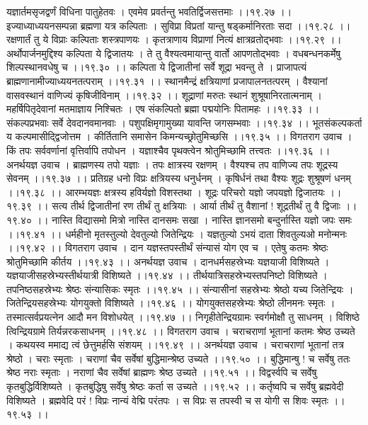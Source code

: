 \documentclass[11pt]{book}
\begin{document}
\begin{landscape}
यज्ञार्तमसृजद्वर्णं विधिना पातुहेतवः ।
एवमेव प्रवर्तन्तु भवतिर्द्विजसत्तमाः ।।१९.२७ ।।
इज्याध्याध्ययनसम्पन्ना ब्रह्मणा यत्र कल्पिताः ।
सुविप्रा विप्रतां यान्तु षड्कर्मानिरताः सदा ।।१९.२८ ।।
रक्षणार्तं तु ये विप्राः कल्पिताः शस्त्रपाणयः ।
कृतत्राणाय विप्राणां नित्यं क्षात्रव्रतोद्भवाः ।।१९.२९ ।।
अर्थोपार्जनमुद्दिश्य कल्पिता ये द्विजातयः ।
ते तु वैश्यत्वमायान्तु वार्तो आपणतोद्भवाः ।
वधबन्धनकर्मेषु शिल्पस्थानवधेषु च ।।१९.३० ।।
कल्पिता ये द्विजातीनां सर्वे शूद्रा भवन्तु ते ।
प्राजापत्यं ब्राह्मणानामीज्याध्ययनतत्पराम् ।।१९.३१ ।।
स्थानमैन्द्रं क्षत्रियाणां प्रजापालनतत्परम् ।
वैश्यानां वासवस्थानं वाणिज्यं कृषिजीविनाम् ।।१९.३२ ।।
शूद्राणां मरुतः स्थानं शुश्रूषानिरतात्मनाम् ।
महर्षिपितृदेवानां मतमाज्ञाय निश्चितः ।
एष संकल्पितो ब्रह्मा पद्मयोनिः पितामहः ।।१९.३३ ।।
संकल्पप्रभवाः सर्वे देवदानवमानवाः ।
पशुपक्षिमृगामुख्या यावन्ति जगसम्भवाः ।।१९.३४ ।।
भूतसंकल्पकर्ता य कल्पमासीद्द्विजोत्तम ।
कीर्तितानि समासेन किमन्यच्छ्रोतुमिच्छसि ।।१९.३५ ।।
विगतराग उवाच ।
किं तपः सर्ववर्णानां वृत्तिर्वापि तपोधन ।
यज्ञाश्चैव पृथक्त्वेन श्रोतुमिच्छामि तत्त्वतः ।।१९.३६ ।।
अनर्थयज्ञ उवाच ।
ब्राह्मणस्य तपो यज्ञाः  । तपः क्षात्रस्य रक्षणम् ।
वैश्यश्च तप वाणिज्य तपः शूद्रस्य सेवनम् ।।१९.३७ ।।
प्रतिग्रह धनो विप्रः क्षत्रियस्य धनुर्धनम् ।
कृषिर्धनं तथा वैश्यः शूद्रः शुश्रूषणं धनम् ।।१९.३८ ।।
आरम्भयज्ञः क्षत्रस्य हविर्यज्ञो विशस्तथा ।
शूद्रः परिचरो यज्ञो जपयज्ञो द्विजातयः ।।१९.३९ ।।
सत्य तीर्थ द्विजातीनां रण तीर्थं तु क्षत्रियाः ।
आर्या तीर्थं तु वैशानां ! शूद्रतीर्थं तु वै द्विजाः ।।१९.४० ।।
नास्ति विद्यासमो मित्रो नास्ति दानसमः सखा ।
नास्ति ज्ञानसमो बन्दुर्नास्ति यज्ञो जपः समः ।।१९.४१ ।।
धर्महीनो मृतस्तुल्यो देवतुल्यो जितेन्द्रियः ।
यज्ञतुल्यो ऽभयं दाता शिवतुल्यओ मनोन्मनः ।।१९.४२ ।।
विगतराग उवाच ।
दान यज्ञस्तपस्तीर्थं संन्यासं योग एव च ।
एतेषु कतमः श्रेष्ठः श्रोतुमिच्छामि कीर्तय ।।१९.४३ ।।
अनर्थयज्ञ उवाच ।
दानधर्मसहस्रेभ्यः यज्ञयाजी विशिष्यते ।
यज्ञयाजीसहस्रेभ्यस्तीर्थयात्री विशिष्यते ।।१९.४४ ।।
तीर्थयात्रिसहस्रेभ्यस्तपनिष्टो विशिष्यते ।
तपनिष्ठसहस्रेभ्यः श्रेष्ठः संन्यासिकः स्मृतः ।।१९.४५ ।।
संन्यासीनां सहस्रेभ्यः श्रेष्ठो यच्य जितेन्द्रियः ।
जितेन्द्रियसहस्रेभ्यः योगयुक्तो विशिष्यते ।।१९.४६ ।।
योगयुक्तसहस्रेभ्यः श्रेष्ठो लीनमनः स्मृतः ।
तस्मात्सर्वप्रयत्नेन आदौ मन विशोधयेत् ।।१९.४७ ।।
निगृहीतेन्द्रियग्रामः स्वर्गमोक्षौ तु साधनम् ।
विशिष्ठे त्विन्द्रियग्रामे तिर्यन्नरकसाधनम् ।।१९.४८ ।।
विगतराग उवाच ।
चराचराणां भूतानां कतमः श्रेष्ठ उच्यते ।
कथयस्व ममाद्य त्वं छेत्तुमर्हसि संशयम् ।।१९.४९ ।।
अनर्थयज्ञ उवाच ।
चराचराणां भूतानां तत्र श्रेष्ठो  । चराः स्मृताः ।
चराणां चैव सर्वेषां बुद्धिमान्श्रेष्ठ उच्यते ।।१९.५० ।।
बुद्धिमान्षु ! च सर्वेषु ततः श्रेष्ठ नराः स्मृताः ।
नराणां चैव सर्वेषां ब्राह्मणः श्रेष्ठ उच्यते ।।१९.५१ ।।
विद्वर्स्वपि च सर्वेषु कृतबुद्धिर्विशिष्यते ।
कृतबुद्धिषु सर्वेषु श्रेष्ठः कर्ता स उच्यते ।।१९.५२ ।।
कर्तृष्वपि च सर्वेषु ब्रह्मवेदी विशिष्यते ।
ब्रह्मवेदि परं ! विप्रः नान्यं वेद्मि परंतपः ।
स विप्रः स तपस्वी च स योगी स शिवः स्मृतः ।।१९.५३ ।।


\end{landscape}
\end{document}

